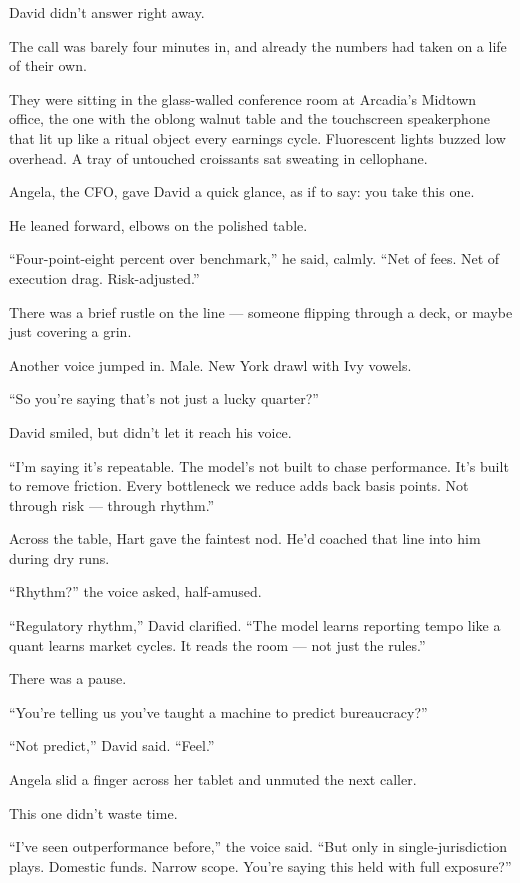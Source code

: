 David didn’t answer right away.

The call was barely four minutes in, and already the numbers had taken on a life of their own.

They were sitting in the glass-walled conference room at Arcadia’s Midtown office, the one with the oblong walnut table and the touchscreen speakerphone that lit up like a ritual object every earnings cycle. Fluorescent lights buzzed low overhead. A tray of untouched croissants sat sweating in cellophane.

Angela, the CFO, gave David a quick glance, as if to say: you take this one.

He leaned forward, elbows on the polished table.

“Four-point-eight percent over benchmark,” he said, calmly. “Net of fees. Net of execution drag. Risk-adjusted.”

There was a brief rustle on the line — someone flipping through a deck, or maybe just covering a grin.

Another voice jumped in. Male. New York drawl with Ivy vowels.

“So you’re saying that’s not just a lucky quarter?”

David smiled, but didn’t let it reach his voice.

“I’m saying it’s repeatable. The model’s not built to chase performance. It’s built to remove friction. Every bottleneck we reduce adds back basis points. Not through risk — through rhythm.”

Across the table, Hart gave the faintest nod. He’d coached that line into him during dry runs.

“Rhythm?” the voice asked, half-amused.

“Regulatory rhythm,” David clarified. “The model learns reporting tempo like a quant learns market cycles. It reads the room — not just the rules.”

There was a pause.

“You’re telling us you’ve taught a machine to predict bureaucracy?”

“Not predict,” David said. “Feel.”

\medskip

Angela slid a finger across her tablet and unmuted the next caller.

This one didn’t waste time.

“I’ve seen outperformance before,” the voice said. “But only in single-jurisdiction plays. Domestic funds. Narrow scope. You’re saying this held with full exposure?”


